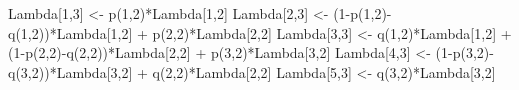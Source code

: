 \documentclass[]{tufte-book}
\newenvironment{Shaded}{}{}
\newcommand{\DecValTok}[1]{\textcolor[rgb]{0.25,0.63,0.44}{#1}}
\newcommand{\FunctionTok}[1]{\textcolor[rgb]{0.02,0.16,0.49}{#1}}
\newcommand{\NormalTok}[1]{#1}
\newcommand{\OtherTok}[1]{\textcolor[rgb]{0.00,0.44,0.13}{#1}}
\newcommand{\SpecialCharTok}[1]{\textcolor[rgb]{0.25,0.44,0.63}{#1}}
\begin{document}
\begin{Shaded}
\begin{Highlighting}[]
\NormalTok{  Lambda[}\DecValTok{1}\NormalTok{,}\DecValTok{3}\NormalTok{] }\OtherTok{\textless{}{-}} \FunctionTok{p}\NormalTok{(}\DecValTok{1}\NormalTok{,}\DecValTok{2}\NormalTok{)}\SpecialCharTok{*}\NormalTok{Lambda[}\DecValTok{1}\NormalTok{,}\DecValTok{2}\NormalTok{]}
\NormalTok{  Lambda[}\DecValTok{2}\NormalTok{,}\DecValTok{3}\NormalTok{] }\OtherTok{\textless{}{-}}\NormalTok{ (}\DecValTok{1}\SpecialCharTok{{-}}\FunctionTok{p}\NormalTok{(}\DecValTok{1}\NormalTok{,}\DecValTok{2}\NormalTok{)}\SpecialCharTok{{-}}\FunctionTok{q}\NormalTok{(}\DecValTok{1}\NormalTok{,}\DecValTok{2}\NormalTok{))}\SpecialCharTok{*}\NormalTok{Lambda[}\DecValTok{1}\NormalTok{,}\DecValTok{2}\NormalTok{] }\SpecialCharTok{+} \FunctionTok{p}\NormalTok{(}\DecValTok{2}\NormalTok{,}\DecValTok{2}\NormalTok{)}\SpecialCharTok{*}\NormalTok{Lambda[}\DecValTok{2}\NormalTok{,}\DecValTok{2}\NormalTok{]}
\NormalTok{  Lambda[}\DecValTok{3}\NormalTok{,}\DecValTok{3}\NormalTok{] }\OtherTok{\textless{}{-}} \FunctionTok{q}\NormalTok{(}\DecValTok{1}\NormalTok{,}\DecValTok{2}\NormalTok{)}\SpecialCharTok{*}\NormalTok{Lambda[}\DecValTok{1}\NormalTok{,}\DecValTok{2}\NormalTok{] }\SpecialCharTok{+}\NormalTok{ (}\DecValTok{1}\SpecialCharTok{{-}}\FunctionTok{p}\NormalTok{(}\DecValTok{2}\NormalTok{,}\DecValTok{2}\NormalTok{)}\SpecialCharTok{{-}}\FunctionTok{q}\NormalTok{(}\DecValTok{2}\NormalTok{,}\DecValTok{2}\NormalTok{))}\SpecialCharTok{*}\NormalTok{Lambda[}\DecValTok{2}\NormalTok{,}\DecValTok{2}\NormalTok{] }\SpecialCharTok{+} \FunctionTok{p}\NormalTok{(}\DecValTok{3}\NormalTok{,}\DecValTok{2}\NormalTok{)}\SpecialCharTok{*}\NormalTok{Lambda[}\DecValTok{3}\NormalTok{,}\DecValTok{2}\NormalTok{]}
\NormalTok{  Lambda[}\DecValTok{4}\NormalTok{,}\DecValTok{3}\NormalTok{] }\OtherTok{\textless{}{-}}\NormalTok{ (}\DecValTok{1}\SpecialCharTok{{-}}\FunctionTok{p}\NormalTok{(}\DecValTok{3}\NormalTok{,}\DecValTok{2}\NormalTok{)}\SpecialCharTok{{-}}\FunctionTok{q}\NormalTok{(}\DecValTok{3}\NormalTok{,}\DecValTok{2}\NormalTok{))}\SpecialCharTok{*}\NormalTok{Lambda[}\DecValTok{3}\NormalTok{,}\DecValTok{2}\NormalTok{] }\SpecialCharTok{+} \FunctionTok{q}\NormalTok{(}\DecValTok{2}\NormalTok{,}\DecValTok{2}\NormalTok{)}\SpecialCharTok{*}\NormalTok{Lambda[}\DecValTok{2}\NormalTok{,}\DecValTok{2}\NormalTok{]}
\NormalTok{  Lambda[}\DecValTok{5}\NormalTok{,}\DecValTok{3}\NormalTok{] }\OtherTok{\textless{}{-}} \FunctionTok{q}\NormalTok{(}\DecValTok{3}\NormalTok{,}\DecValTok{2}\NormalTok{)}\SpecialCharTok{*}\NormalTok{Lambda[}\DecValTok{3}\NormalTok{,}\DecValTok{2}\NormalTok{]}


\end{Highlighting}
\end{Shaded}
\end{document}

